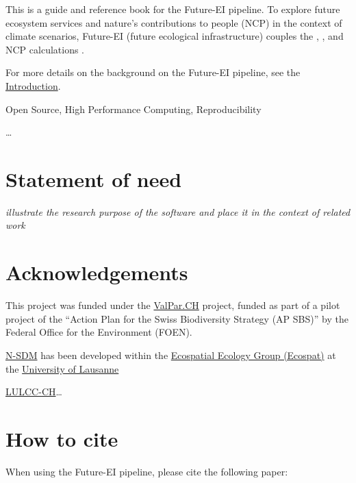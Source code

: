 \documentclass[
  letterpaper,
  DIV=11,
  numbers=noendperiod]{scrreprt}
\begin{document}
This is a guide and reference book for the Future-EI pipeline. To
explore future ecosystem services and nature's contributions to people
(NCP) in the context of climate scenarios, Future-EI (future ecological
infrastructure) couples the , , and NCP calculations .

For more details on the background on the Future-EI pipeline, see the
\href{intro.qmd}{Introduction}.

Open Source, High Performance Computing, Reproducibility

\ldots{}

\section*{Statement of need}\label{statement-of-need}


\emph{illustrate the research purpose of the software and place it in
the context of related work}

\section*{Acknowledgements}\label{acknowledgements}


This project was funded under the
\href{https://valpar.ch/index_en.php?page=home_en}{ValPar.CH} project,
funded as part of a pilot project of the ``Action Plan for the Swiss
Biodiversity Strategy (AP SBS)'' by the Federal Office for the
Environment (FOEN).

\href{https://github.com/N-SDM/N-SDM}{N-SDM} has been developed within
the \href{https://www.unil.ch/ecospat/en/home.html}{Ecospatial Ecology
Group (Ecospat)} at the
\href{https://www.unil.ch/central/en/home.html}{University of Lausanne}

\href{https://github.com/blenback/LULCC-CH}{LULCC-CH}\ldots{}

\section*{How to cite}\label{how-to-cite}


When using the Future-EI pipeline, please cite the following paper:
\end{document}
